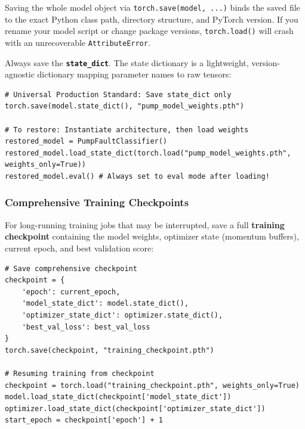 \begin{warning}
Saving the whole model object via \texttt{torch.save(model, ...)} binds the saved file to the exact Python class path, directory structure, and PyTorch version. If you rename your model script or change package versions, \texttt{torch.load()} will crash with an unrecoverable \texttt{AttributeError}.

Always save the \textbf{\texttt{state\_dict}}. The state dictionary is a lightweight, version-agnostic dictionary mapping parameter names to raw tensors:
\begin{lstlisting}[style=pythonstyle]
# Universal Production Standard: Save state_dict only
torch.save(model.state_dict(), "pump_model_weights.pth")

# To restore: Instantiate architecture, then load weights
restored_model = PumpFaultClassifier()
restored_model.load_state_dict(torch.load("pump_model_weights.pth", weights_only=True))
restored_model.eval() # Always set to eval mode after loading!
\end{lstlisting}
\end{warning}

\subsubsection{Comprehensive Training Checkpoints}

For long-running training jobs that may be interrupted, save a full \textbf{training checkpoint} containing the model weights, optimizer state (momentum buffers), current epoch, and best validation score:
\begin{lstlisting}[style=pythonstyle]
# Save comprehensive checkpoint
checkpoint = {
    'epoch': current_epoch,
    'model_state_dict': model.state_dict(),
    'optimizer_state_dict': optimizer.state_dict(),
    'best_val_loss': best_val_loss
}
torch.save(checkpoint, "training_checkpoint.pth")

# Resuming training from checkpoint
checkpoint = torch.load("training_checkpoint.pth", weights_only=True)
model.load_state_dict(checkpoint['model_state_dict'])
optimizer.load_state_dict(checkpoint['optimizer_state_dict'])
start_epoch = checkpoint['epoch'] + 1
\end{lstlisting}

